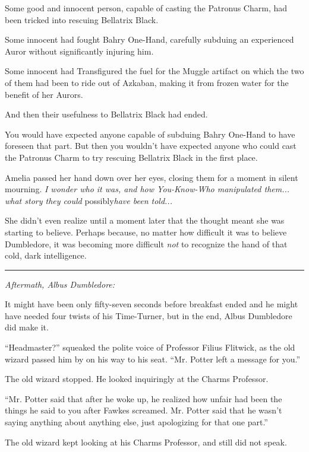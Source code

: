 Some good and innocent person, capable of casting the Patronus Charm,
had been tricked into rescuing Bellatrix Black.

Some innocent had fought Bahry One-Hand, carefully subduing an
experienced Auror without significantly injuring him.

Some innocent had Transfigured the fuel for the Muggle artifact on which
the two of them had been to ride out of Azkaban, making it from frozen
water for the benefit of her Aurors.

And then their usefulness to Bellatrix Black had ended.

You would have expected anyone capable of subduing Bahry One-Hand to
have foreseen that part. But then you wouldn't have expected anyone who
could cast the Patronus Charm to try rescuing Bellatrix Black in the
first place.

Amelia passed her hand down over her eyes, closing them for a moment in
silent mourning. \emph{I wonder who it was, and how You-Know-Who
manipulated them... what story they could} possibly\emph{have been
told...}

She didn't even realize until a moment later that the thought meant she
was starting to believe. Perhaps because, no matter how difficult it was
to believe Dumbledore, it was becoming more difficult \emph{not} to
recognize the hand of that cold, dark intelligence.

\begin{center}\rule{3in}{0.4pt}\end{center}

\emph{Aftermath, Albus Dumbledore:}

It might have been only fifty-seven seconds before breakfast ended and
he might have needed four twists of his Time-Turner, but in the end,
Albus Dumbledore did make it.

``Headmaster?'' squeaked the polite voice of Professor Filius Flitwick,
as the old wizard passed him by on his way to his seat. ``Mr. Potter
left a message for you.''

The old wizard stopped. He looked inquiringly at the Charms Professor.

``Mr. Potter said that after he woke up, he realized how unfair had been
the things he said to you after Fawkes screamed. Mr. Potter said that he
wasn't saying anything about anything else, just apologizing for that
one part.''

The old wizard kept looking at his Charms Professor, and still did not
speak.

